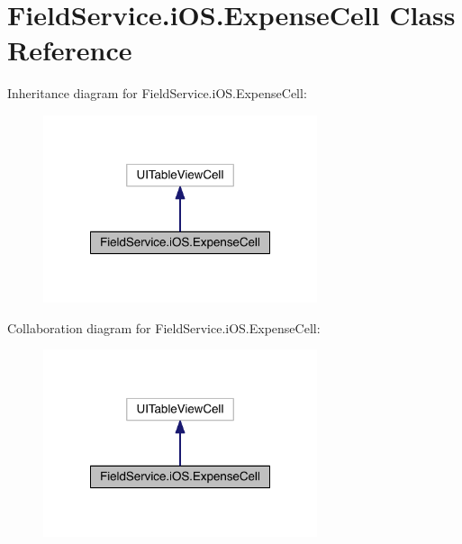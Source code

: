 \hypertarget{class_field_service_1_1i_o_s_1_1_expense_cell}{\section{Field\+Service.\+i\+O\+S.\+Expense\+Cell Class Reference}
\label{class_field_service_1_1i_o_s_1_1_expense_cell}
}


Inheritance diagram for Field\+Service.\+i\+O\+S.\+Expense\+Cell\+:
\nopagebreak
\begin{figure}[H]
\begin{center}
\leavevmode
\includegraphics[width=228pt]{class_field_service_1_1i_o_s_1_1_expense_cell__inherit__graph}
\end{center}
\end{figure}


Collaboration diagram for Field\+Service.\+i\+O\+S.\+Expense\+Cell\+:
\nopagebreak
\begin{figure}[H]
\begin{center}
\leavevmode
\includegraphics[width=228pt]{class_field_service_1_1i_o_s_1_1_expense_cell__coll__graph}
\end{center}
\end{figure}
